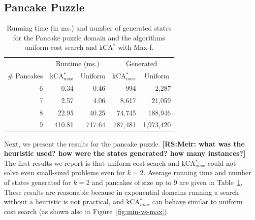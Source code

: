 \documentclass{aicom2e}
\newcommand{\kastar}{kCA$^*$}
\newcommand{\kastarmax}{kCA$^*_{max}$}
\newcommand{\maxf}{Max-f}
\newcommand{\roni}[1]{\textbf{[RS:#1]}}
\begin{document}
\subsection{Pancake Puzzle}

\begin{table}[]
    \centering
    \begin{tabular}{|r|r|r|r|r|}
        \multicolumn{1}{l|}{}            & \multicolumn{2}{c|}{Runtime (ms.)}                                       & \multicolumn{2}{c}{Generated}                                           \\
        \multicolumn{1}{c|}{\# Pancakes} & \multicolumn{1}{c}{\kastarmax{}} & \multicolumn{1}{c|}{Uniform} & \multicolumn{1}{c}{\kastarmax{}} & \multicolumn{1}{c}{Uniform} \\ \hline
        6                               & 0.34                                      & 0.46                        & 994                                       & 2,287                       \\
        7                               & 2.57                                      & 4.06                        & 8,617                                     & 21,059                      \\
        8                               & 22.95                                     & 40.25                       & 74,745                                    & 188,946                     \\
        9                               & 410.81                                    & 717.64                      & 787,481                                   &
        1,973,420\\
        \hline
    \end{tabular}
    \caption{Running time (in ms.) and number of generated states for the Pancake puzzle domain and the algorithms uniform cost search and \kastar{} with \maxf{}.}
\label{tab:pancake-max-uniform}
\end{table}


Next, we present the results for the pancake puzzle. \roni{Meir: what was the
heuristic used? how were the states generated? how many instances?} The first
results we report is that uniform cost search and \kastarmax{} could not solve
even small-sized problems even for $k=2$. Average running time and number of
states generated  for $k=2$ and pancakes of size up to 9 are given in
Table~\ref{tab:pancake-max-uniform}. These results are reasonable because in
exponential domains running a search without a heuristic is not practical, and
\kastarmax{} can behave similar to uniform cost search (as shown also in
Figure~\ref{fig:min-vs-max}).
\end{document}
